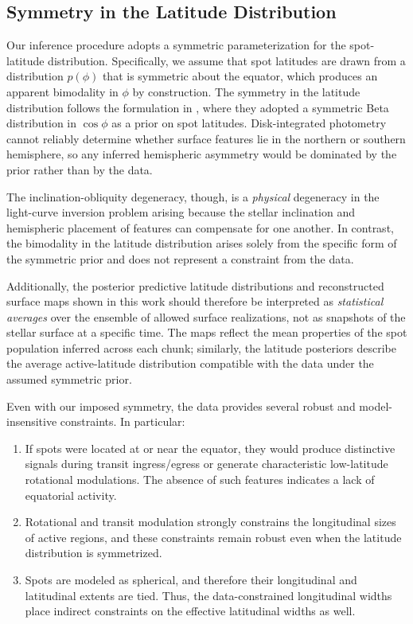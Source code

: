 \documentclass[twocolumn]{aastex631}
\begin{document}
\subsection{Symmetry in the Latitude Distribution}
\label{subsec:bimodality}

Our inference procedure adopts a symmetric parameterization for the spot-latitude
distribution. Specifically, we assume that spot latitudes are drawn from a
distribution $p(\phi)$ that is symmetric about the equator, which produces an
apparent bimodality in $\phi$ by construction. The symmetry in the latitude distribution follows the formulation in 
\cite{Luger2021b}, where they adopted a symmetric Beta distribution in $\cos\phi$ as a prior on spot latitudes. 
Disk-integrated photometry cannot reliably determine whether surface features lie
in the northern or southern hemisphere, so any inferred hemispheric asymmetry would
be dominated by the prior rather than by the data.

The inclination-obliquity degeneracy, though, is a \textit{physical} degeneracy in
the light-curve inversion problem arising because the stellar inclination and
hemispheric placement of features can compensate for one another. In contrast, the
bimodality in the latitude distribution arises solely from the specific form of the
symmetric prior and does not represent a constraint from the data.

Additionally, the posterior predictive latitude distributions and reconstructed surface maps
shown in this work should therefore be interpreted as \textit{statistical averages}
over the ensemble of allowed surface realizations, not as snapshots of the stellar
surface at a specific time. The maps reflect the mean properties of the spot
population inferred across each chunk; similarly, the latitude posteriors describe
the average active-latitude distribution compatible with the data under the assumed
symmetric prior.

Even with our imposed symmetry, the data provides several robust and
model-insensitive constraints. In particular:

\begin{enumerate}
    \item If spots were located at or near the equator, they would produce distinctive
    signals during transit ingress/egress or generate
    characteristic low-latitude rotational modulations. The absence of such features
    indicates a lack of equatorial activity.

    \item Rotational and transit modulation strongly constrains the longitudinal sizes
    of active regions, and these constraints remain robust even when the latitude
    distribution is symmetrized.

    \item Spots are modeled as spherical, and therefore their longitudinal and latitudinal
    extents are tied. Thus, the data-constrained longitudinal widths place indirect
    constraints on the effective latitudinal widths as well.
\end{enumerate}
\end{document}
